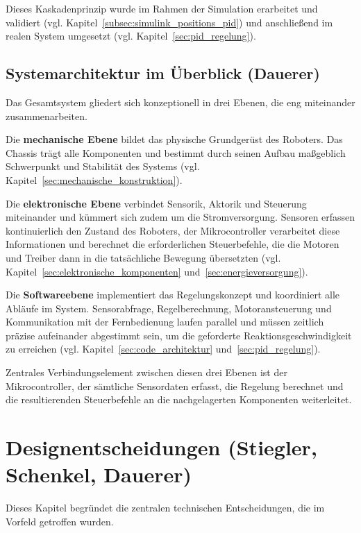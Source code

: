 \documentclass[fontsize=12pt,
parskip=half,	%
department=FakM,  %
logostyle=flat,
twoside, %
DIV=15,BCOR=10mm, %
]{OTHRreprt}
\begin{document}
Dieses Kas\-ka\-den\-prin\-zip wurde im Rahmen der Simulation erarbeitet und validiert 
(vgl. Kapitel~\ref{subsec:simulink_positions_pid}) und anschließend im realen System 
umgesetzt (vgl. Kapitel~\ref{sec:pid_regelung}).

\section{Systemarchitektur im Überblick (Dauerer)}
\label{sec:systemarchitektur_ueberblick}

Das Gesamtsystem gliedert sich konzeptionell in drei Ebenen, die eng miteinander zusammenarbeiten.

Die \textbf{mechanische Ebene} bildet das physische Grundgerüst des Roboters. Das Chassis trägt alle 
Komponenten und bestimmt durch seinen Aufbau maßgeblich Schwerpunkt und Stabilität des Systems 
(vgl. Kapitel~\ref{sec:mechanische_konstruktion}).

Die \textbf{elektronische Ebene} verbindet Sensorik, Aktorik und Steuerung miteinander und 
kümmert sich zudem um die Stromversorgung. Sensoren erfassen 
kontinuierlich den Zustand des Roboters, der Mikrocontroller verarbeitet diese Informationen und berechnet 
die erforderlichen Steuerbefehle, die die Motoren und Treiber dann in die tatsächliche Bewegung übersetzten
(vgl. Kapitel~\ref{sec:elektronische_komponenten} und~\ref{sec:energieversorgung}).

Die \textbf{Softwareebene} implementiert das Regelungskonzept und koordiniert alle Abläufe im System. 
Sensorabfrage, Regelberechnung, Motoransteuerung und Kommunikation mit der Fernbedienung laufen parallel
und müssen zeitlich präzise aufeinander abgestimmt sein, um die geforderte Reaktionsgeschwindigkeit 
zu erreichen (vgl. Kapitel~\ref{sec:code_architektur} und~\ref{sec:pid_regelung}).

Zentrales Verbindungselement zwischen diesen drei Ebenen ist der Mikrocontroller, der sämtliche Sensordaten 
erfasst, die Regelung berechnet und die resultierenden Steuerbefehle an die nachgelagerten 
Komponenten weiterleitet.

\chapter{Designentscheidungen (Stiegler, Schenkel, Dauerer)}
\label{ch:designentscheidungen}

Dieses Kapitel begründet die zentralen technischen Entscheidungen, die im Vorfeld getroffen wurden.
\end{document}

